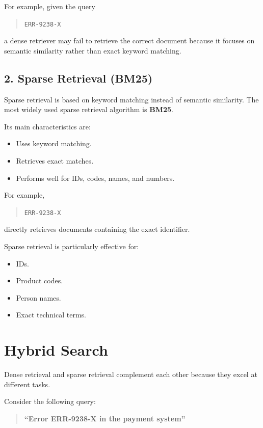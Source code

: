 For example, given the query

\begin{quote}
\texttt{ERR-9238-X}
\end{quote}

a dense retriever may fail to retrieve the correct document because it focuses on semantic similarity rather than exact keyword matching.

\subsection*{2. Sparse Retrieval (BM25)}

Sparse retrieval is based on keyword matching instead of semantic similarity. The most widely used sparse retrieval algorithm is \textbf{BM25}.

Its main characteristics are:

\begin{itemize}
    \item Uses keyword matching.
    \item Retrieves exact matches.
    \item Performs well for IDs, codes, names, and numbers.
\end{itemize}

For example,

\begin{quote}
\texttt{ERR-9238-X}
\end{quote}

directly retrieves documents containing the exact identifier.

Sparse retrieval is particularly effective for:

\begin{itemize}
    \item IDs.
    \item Product codes.
    \item Person names.
    \item Exact technical terms.
\end{itemize}
\section{Hybrid Search}

Dense retrieval and sparse retrieval complement each other because they excel at different tasks.

Consider the following query:

\begin{quote}
\textbf{``Error ERR-9238-X in the payment system''}
\end{quote}

